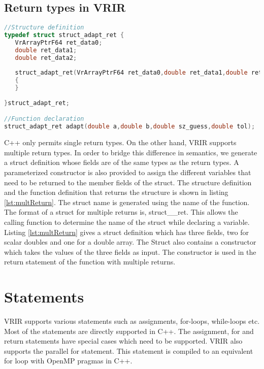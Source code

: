 \subsection{Return types in VRIR}
\begin{lstlisting}[float,language=c,caption={Generated structure to handle multiple returns.},label={lst:multReturn}]
//Structure definition
typedef struct struct_adapt_ret { 
   VrArrayPtrF64 ret_data0;
   double ret_data1;
   double ret_data2;
   
   struct_adapt_ret(VrArrayPtrF64 ret_data0,double ret_data1,double ret_data2) :ret_data0(ret_data0),ret_data1(ret_data1),ret_data2(ret_data2)
   {
   }
   
}struct_adapt_ret;

//Function declaration
struct_adapt_ret adapt(double a,double b,double sz_guess,double tol);
\end{lstlisting}
C++ only permits single return types. On the other hand, VRIR supports multiple return types. In order to bridge this difference in semantics, we generate a struct definition whose fields are of the same types as the return types. A parameterized constructor is also provided to assign the different variables that need to be returned to the member fields of the struct. The structure definition and the function definition that returns the structure is shown in listing \ref{lst:multReturn}. The struct name is generated using the name of the function. The format of a struct for multiple returns is, struct\_<function name>\_ret. This allows the calling function to determine the name of the struct while declaring a variable. Listing \ref{lst:multReturn} gives a struct definition which has three fields, two for scalar doubles and one for a double array. The Struct also contains a constructor which takes the values of the three fields as input. The constructor is used in the return statement of the function with multiple returns.
\section{Statements}
VRIR supports various statements such as assignments, for-loops, while-loops etc. Most of the statements are directly supported in C++. The assignment, for and return statements have special cases which need to be supported. VRIR also supports the parallel for statement. This statement is compiled to an equivalent for loop with OpenMP pragmas in C++.
